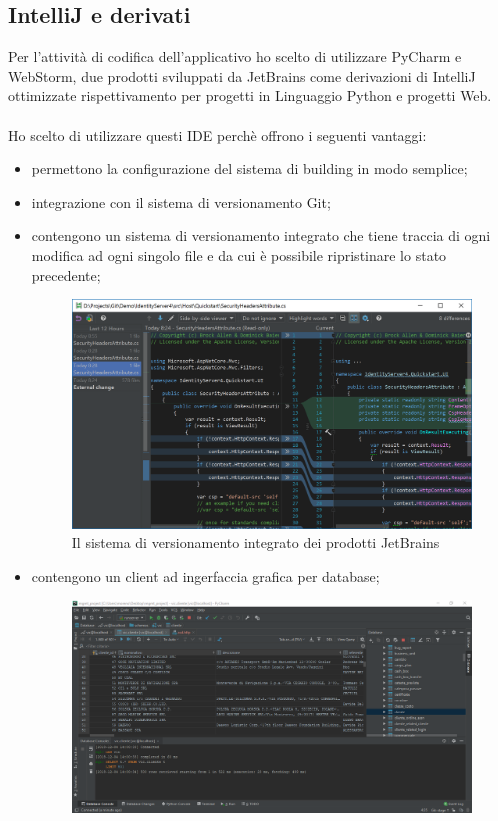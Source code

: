 	\subsection{IntelliJ e derivati}
	\label{tec:intellij}
	Per l'attività di codifica dell'applicativo ho scelto di utilizzare PyCharm e WebStorm, due prodotti sviluppati da JetBrains come derivazioni di IntelliJ ottimizzate rispettivamento per progetti in Linguaggio Python e progetti Web.\\ \\
	Ho scelto di utilizzare questi IDE perchè offrono i seguenti vantaggi:
	\begin{itemize}
	\item permettono la configurazione del sistema di building in modo semplice;
	\item integrazione con il sistema di versionamento Git; 
	\item contengono un sistema di versionamento integrato che tiene traccia di ogni modifica ad ogni singolo file e da cui è possibile ripristinare lo stato precedente;
		\begin{figure}[H]
			\centering
			\includegraphics[width=0.8\linewidth]{immagini/ide-history}
			\caption{Il sistema di versionamento integrato dei prodotti JetBrains}
			\label{fig:ide-history}
		\end{figure}
	\item contengono un client ad ingerfaccia grafica per database;
		\begin{figure}[H]
			\centering
			\includegraphics[width=0.8\linewidth]{immagini/ide-database}

\end{figure}
\end{itemize}
